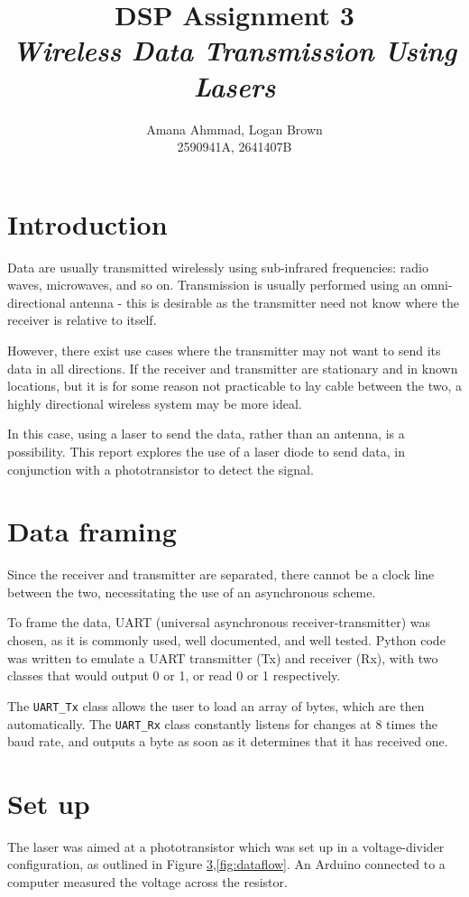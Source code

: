 \documentclass{article}
\title{DSP Assignment 3 \\ \textit{Wireless Data Transmission Using Lasers}}
\author{Amana Ahmmad, Logan Brown \\ 2590941A, 2641407B}
\begin{document}
\maketitle

\begin{multicols}{2}

\section{Introduction}
Data are usually transmitted wirelessly using sub-infrared frequencies: radio waves, microwaves, and so on. Transmission is usually performed using an omni-directional antenna - this is desirable as the transmitter need not know where the receiver is relative to itself.  

However, there exist use cases where the transmitter may not want to send its data in all directions. If the receiver and transmitter are stationary and in known locations, but it is for some reason not practicable to lay cable between the two, a highly directional wireless system may be more ideal. 

In this case, using a laser to send the data, rather than an antenna, is a possibility. This report explores the use of a laser diode to send data, in conjunction with a phototransistor to detect the signal.

\section{Data framing}
Since the receiver and transmitter are separated, there cannot be a clock line between the two, necessitating the use of an asynchronous scheme. 

To frame the data, UART (universal asynchronous receiver-transmitter) was chosen, as it is commonly used, well documented, and well tested. Python code was written to emulate a UART transmitter (Tx) and receiver (Rx), with two classes that would output 0 or 1, or read 0 or 1 respectively.

The \texttt{UART\_Tx} class allows the user to load an array of bytes, which are then  automatically. The \texttt{UART\_Rx} class constantly listens for changes at 8 times the baud rate, and outputs a byte as soon as it determines that it has received one.

\section{Set up}
The laser was aimed at a phototransistor which was set up in a voltage-divider configuration, as outlined in Figure \ref{},\ref{fig:dataflow}. An Arduino connected to a computer measured the voltage across the resistor.


\end{multicols}
\end{document}
